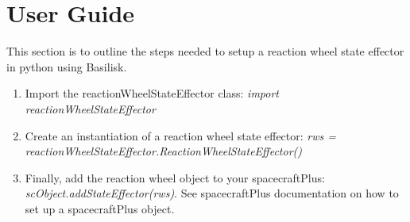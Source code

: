 \section{User Guide}

This section is to outline the steps needed to setup a reaction wheel state effector in python using Basilisk.

\begin{enumerate}
	\item Import the reactionWheelStateEffector class: \newline \textit{import reactionWheelStateEffector}
	\item Create an instantiation of a reaction wheel state effector: \newline \textit{rws = reactionWheelStateEffector.ReactionWheelStateEffector()}
	\item Finally, add the reaction wheel object to your spacecraftPlus:\newline
	\textit{scObject.addStateEffector(rws)}. See spacecraftPlus documentation on how to set up a spacecraftPlus object. 
\end{enumerate}
